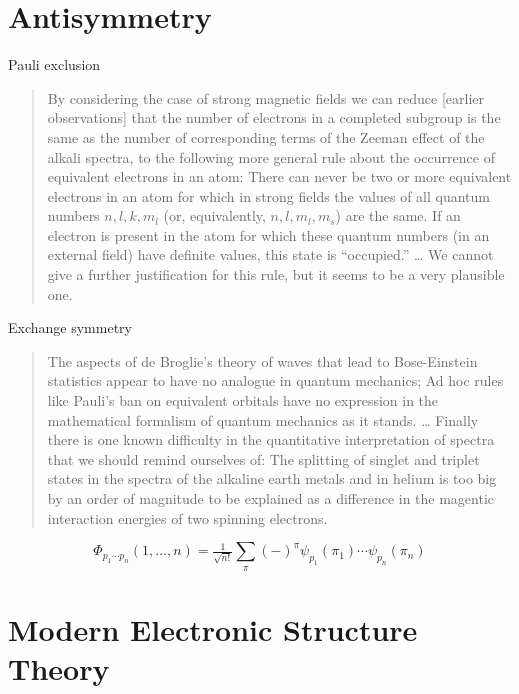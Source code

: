 \section{Antisymmetry}


\noindent
Pauli exclusion\cite{Pauli:1925p756}
\begin{quote}
    By considering the case of strong magnetic fields we can reduce [earlier
    observations] that the number of electrons in a completed subgroup is the
    same as the number of corresponding terms of the Zeeman effect of the alkali
    spectra, to the following more general rule about the occurrence of
    equivalent electrons in an atom:
    There can never be two or more equivalent electrons in an atom for which in
    strong fields the values of all quantum numbers \(n, l, k, m_l\) (or,
    equivalently, \(n, l, m_l, m_s\)) are the same.
    If an electron is present in the atom for which these quantum numbers (in an
    external field) have definite values, this state is ``occupied.''
    \dots
    We cannot give a further justification for this rule, but it seems to be a
    very plausible one.
\end{quote}

\noindent
Exchange symmetry\cite{Heisenberg:1926p411}
\begin{quote}
    The aspects of de Broglie's theory of waves that lead to Bose-Einstein
    statistics\cite{Bose:1924p178,Einstein:1924p261,Einstein:1925p3} appear to
    have no analogue in quantum mechanics;
    Ad hoc rules like Pauli's ban on equivalent orbitals have no expression in
    the mathematical formalism of quantum mechanics as it stands.
    \dots
    Finally there is one known difficulty in the quantitative interpretation of
    spectra that we should remind ourselves of:
    The splitting of singlet and triplet states in the spectra of the alkaline
    earth metals and in helium is too big by an order of magnitude to be
    explained as a difference in the magentic interaction energies of two
    spinning electrons.
\end{quote}


\begin{equation}
    \Phi_{p_1\cdots p_n}(1, \ldots, n)
    =
    \tfrac{1}{\sqrt{n!}}
    \sum_{\pi}
    (-)^\pi
    \psi_{p_1}(\pi_1)
    \cdots
    \psi_{p_n}(\pi_n)
\end{equation}



\section{Modern Electronic Structure Theory}

